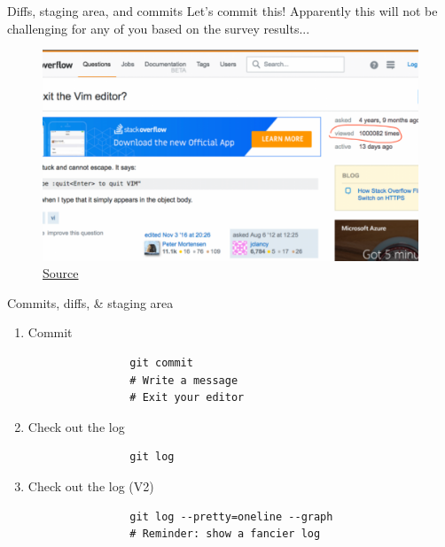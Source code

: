 \documentclass[pdf]{beamer} %
\begin{document}
\begin{frame}[fragile]{Diffs, staging area, and commits}
    Let's commit this! Apparently this will not be challenging for any of you based on the survey results...
    \begin{figure}[htpb]
        \centering
        \includegraphics[width=0.8\linewidth]{fig/exit-vim}
        \caption{\href{https://stackoverflow.blog/2017/05/23/stack-overflow-helping-one-million-developers-exit-vim/}{Source}}
        \label{fig:name}
    \end{figure}
\end{frame} 

\begin{frame}[fragile]{Commits, diffs, \& staging area}
    \begin{enumerate}
        \item Commit
            \begin{verbatim}
                git commit
                # Write a message 
                # Exit your editor
            \end{verbatim}
        \item Check out the log
            \begin{verbatim}
                git log
            \end{verbatim}
        \item Check out the log (V2)
            \begin{verbatim}
                git log --pretty=oneline --graph
                # Reminder: show a fancier log
            \end{verbatim}
    \end{enumerate}
\end{frame}
\end{document}
